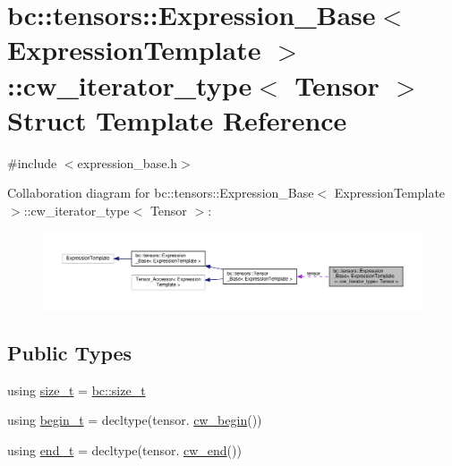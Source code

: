 \hypertarget{structbc_1_1tensors_1_1Expression__Base_1_1cw__iterator__type}{}\section{bc\+:\+:tensors\+:\+:Expression\+\_\+\+Base$<$ Expression\+Template $>$\+:\+:cw\+\_\+iterator\+\_\+type$<$ Tensor $>$ Struct Template Reference}
\label{structbc_1_1tensors_1_1Expression__Base_1_1cw__iterator__type}


{\ttfamily \#include $<$expression\+\_\+base.\+h$>$}



Collaboration diagram for bc\+:\+:tensors\+:\+:Expression\+\_\+\+Base$<$ Expression\+Template $>$\+:\+:cw\+\_\+iterator\+\_\+type$<$ Tensor $>$\+:\nopagebreak
\begin{figure}[H]
\begin{center}
\leavevmode
\includegraphics[width=350pt]{structbc_1_1tensors_1_1Expression__Base_1_1cw__iterator__type__coll__graph}
\end{center}
\end{figure}
\subsection*{Public Types}
\begin{DoxyCompactItemize}
\item 
using \hyperlink{structbc_1_1tensors_1_1Expression__Base_1_1cw__iterator__type_a1423458dda5ab2bd7c7ade4f69fbf081}{size\+\_\+t} = \hyperlink{namespacebc_aaf8e3fbf99b04b1b57c4f80c6f55d3c5}{bc\+::size\+\_\+t}
\item 
using \hyperlink{structbc_1_1tensors_1_1Expression__Base_1_1cw__iterator__type_a61e8ad264dbd2dc886a84e03cd45867e}{begin\+\_\+t} = decltype(tensor. \hyperlink{classbc_1_1tensors_1_1Expression__Base_ab7254a15d10156123aec300006eb1c9d}{cw\+\_\+begin}())
\item 
using \hyperlink{structbc_1_1tensors_1_1Expression__Base_1_1cw__iterator__type_aa4dec4d7233266282d8243b49a101174}{end\+\_\+t} = decltype(tensor. \hyperlink{classbc_1_1tensors_1_1Expression__Base_a4ca9ee5e831fdfa6575e34071927cc1e}{cw\+\_\+end}())
\end{DoxyCompactItemize}
